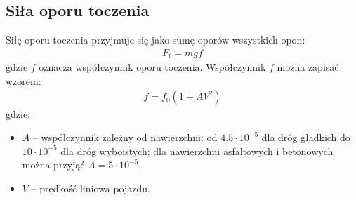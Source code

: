 \documentclass{article}
\begin{document}
	\subsection{Siła oporu toczenia}
	Siłę oporu toczenia przyjmuje się jako sumę oporów wszystkich opon:
	\begin{align}
		F_t=mgf
	\end{align}
	gdzie $f$ oznacza współczynnik oporu toczenia.  
	Współczynnik $f$ można zapisać wzorem:
	\begin{align}
		f=f_0(1+AV^2)
	\end{align}
	gdzie:
	\begin{itemize}
		\item $A$ – współczynnik zależny od nawierzchni: od $4.5\cdot10^{-5}$ dla dróg gładkich do $10\cdot 10^{-5}$ dla dróg wyboistych; dla nawierzchni asfaltowych i betonowych można przyjąć $A=5\cdot 10^{-5}$,
		\item $V$ – prędkość liniowa pojazdu.
	\end{itemize}
	
\end{document}
